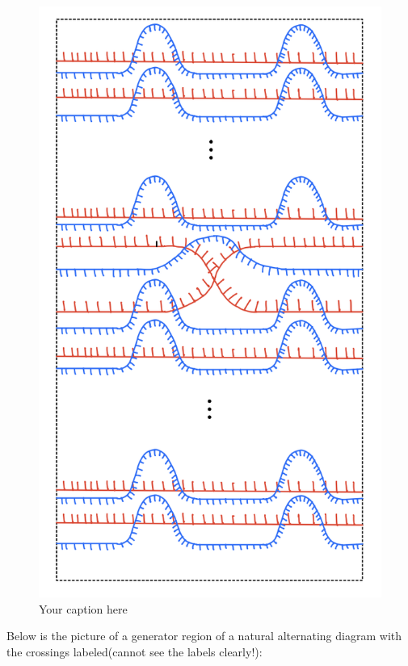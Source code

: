 \begin{definition}
\begin{figure}[H] 
    \centering
    \includegraphics[scale = 0.95]{diagrams/local_systems_on_as_diagrams/2-1.png} 
    \caption{Your caption here}
    \label{fig:your-label}
\end{figure}

Below is the picture of a generator region of a natural alternating diagram with the crossings labeled(cannot see the labels clearly!):


\end{definition}
